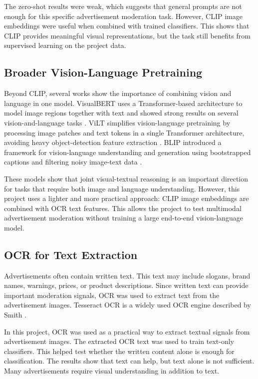 \documentclass[12pt]{article}
\begin{document}
The zero-shot results were weak, which suggests that general prompts are not enough for this specific advertisement moderation task. However, CLIP image embeddings were useful when combined with trained classifiers. This shows that CLIP provides meaningful visual representations, but the task still benefits from supervised learning on the project data.

\subsection{Broader Vision-Language Pretraining}

Beyond CLIP, several works show the importance of combining vision and language in one model. VisualBERT uses a Transformer-based architecture to model image regions together with text and showed strong results on several vision-and-language tasks \cite{li2019visualbert}. ViLT simplifies vision-language pretraining by processing image patches and text tokens in a single Transformer architecture, avoiding heavy object-detection feature extraction \cite{kim2021vilt}. BLIP introduced a framework for vision-language understanding and generation using bootstrapped captions and filtering noisy image-text data \cite{li2022blip}.

These models show that joint visual-textual reasoning is an important direction for tasks that require both image and language understanding. However, this project uses a lighter and more practical approach: CLIP image embeddings are combined with OCR text features. This allows the project to test multimodal advertisement moderation without training a large end-to-end vision-language model.

\subsection{OCR for Text Extraction}

Advertisements often contain written text. This text may include slogans, brand names, warnings, prices, or product descriptions. Since written text can provide important moderation signals, OCR was used to extract text from the advertisement images. Tesseract OCR is a widely used OCR engine described by Smith \cite{smith2007tesseract}.

In this project, OCR was used as a practical way to extract textual signals from advertisement images. The extracted OCR text was used to train text-only classifiers. This helped test whether the written content alone is enough for classification. The results show that text can help, but text alone is not sufficient. Many advertisements require visual understanding in addition to text.
\end{document}
